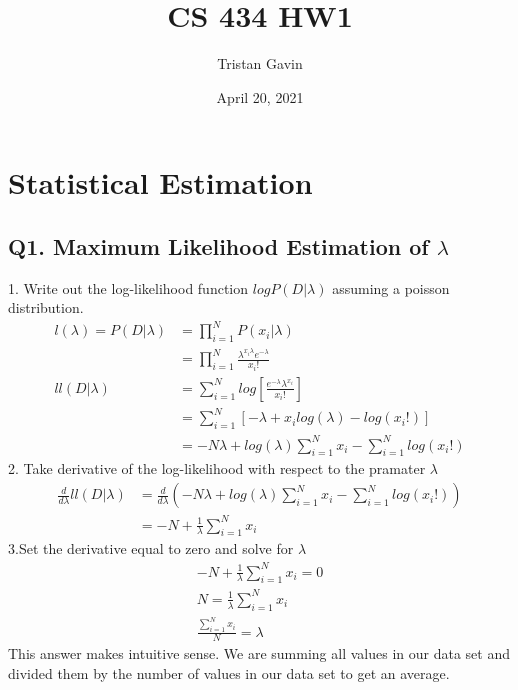 \documentclass{article}
\title{CS 434 HW1}
\author{Tristan Gavin}
\date{April 20, 2021}
\begin{document}
\maketitle

\section{Statistical Estimation}
\subsection*{Q1. Maximum Likelihood Estimation of $\lambda$} 
1. Write out the log-likelihood function $logP(D|\lambda)$ assuming a poisson distribution.
\begin{align}
    l(\lambda)=P(D|\lambda) &= \prod_{i=1}^NP(x_i|\lambda) \\
                            &= \prod_{i=1}^N\frac{\lambda^{x_i\lambda}e^{-\lambda}}{x_i!} \\
    ll(D|\lambda) &= \sum_{i=1}^Nlog[\frac{e^{-\lambda}\lambda^{x_i}}{x_i!}]\\
    &=\sum_{i=1}^N[-\lambda+x_ilog(\lambda)-log(x_i!)]\\
    &=-N\lambda+log(\lambda)\sum_{i=1}^Nx_i-\sum_{i=1}^Nlog(x_i!)
\end{align}
2. Take derivative of the log-likelihood with respect to the pramater $\lambda$
\begin{align}
    \frac{d}{d\lambda}ll(D|\lambda) &= \frac{d}{d\lambda}(-N\lambda+log(\lambda)\sum_{i=1}^Nx_i-\sum_{i=1}^Nlog(x_i!))\\
                                    &= -N+\frac{1}{\lambda}\sum_{i=1}^Nx_i
\end{align}
3.Set the derivative equal to zero and solve for $\lambda$
\begin{align}
    -N+\frac{1}{\lambda}\sum_{i=1}^Nx_i = 0 \\
    N = \frac{1}{\lambda}\sum_{i=1}^Nx_i\\
    \frac{\sum_{i=1}^Nx_i}{N}=\lambda
\end{align}
This answer makes intuitive sense. We are summing all values in our data set and divided them by the number of values in our data set to get an average.
\end{document}
